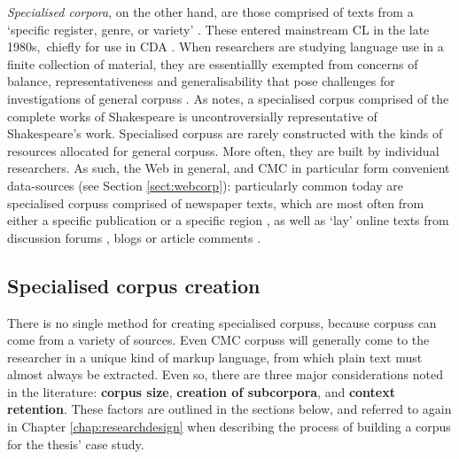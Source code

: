 \emph{Specialised corpora}, on the other hand, are those comprised of texts from a `specific register, genre, or variety' \cite{sinclair_preface_2001}. These entered mainstream \gls{CL} in the late 1980s,~chiefly for use in \gls{CDA} \cite[see][]{hardt-mautner_only_1995}. When researchers are studying language use in a finite collection of material, they are essentiallly exempted from concerns of balance, representativeness and generalisability that pose challenges for investigations of general \glspl{corpus} \cite{hoey_lexical_2005}. As \textcite{baker_sociolinguistics_2010} notes, a specialised \gls{corpus} comprised of the complete works of Shakespeare is uncontroversially representative of Shakespeare's work. Specialised \glspl{corpus} are rarely constructed with the kinds of resources allocated for general \glspl{corpus}. More often, they are built by individual researchers. As such, the Web in general, and \gls{CMC} in particular form convenient data\hyp{}sources (see Section \ref{sect:webcorp}): particularly common today are specialised \glspl{corpus} comprised of newspaper texts, which are most often from either a specific publication or a specific region \cite[e.g.][]{caldas-coulthard_curvy_2010}, as well as `lay' online texts from discussion forums \cite[e.g.][]{lukac_down_2011}, blogs \cite[e.g][]{ptaszynski_annotating_2012} or article comments \cite[e.g.][]{prentice_using_2010}.

\subsection{Specialised corpus creation} \label{sect:ideals}

There is no single method for creating specialised \glspl{corpus}, because \glspl{corpus} can come from a variety of sources. Even \gls{CMC} \glspl{corpus} will generally come to the researcher in a unique kind of markup language, from which plain text must almost always be extracted. Even so, there are three major considerations noted in the literature: \textbf{corpus size}, \textbf{creation of subcorpora}, and \textbf{context retention}. These factors are outlined in the sections below, and referred to again in Chapter \ref{chap:researchdesign} when describing the process of building a \gls{corpus} for the thesis' case study.


